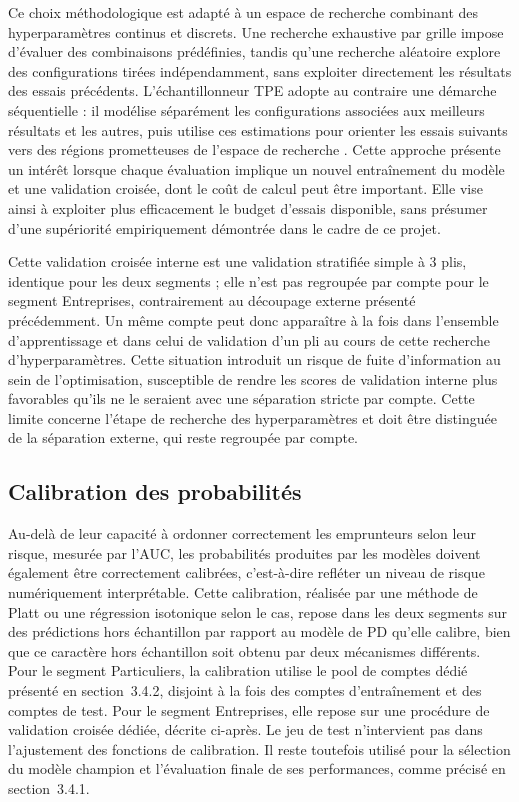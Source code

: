 Ce choix méthodologique est adapté à un espace de recherche combinant des hyperparamètres continus et discrets. Une recherche exhaustive par grille impose d'évaluer des combinaisons prédéfinies, tandis qu'une recherche aléatoire explore des configurations tirées indépendamment, sans exploiter directement les résultats des essais précédents. L'échantillonneur TPE adopte au contraire une démarche séquentielle : il modélise séparément les configurations associées aux meilleurs résultats et les autres, puis utilise ces estimations pour orienter les essais suivants vers des régions prometteuses de l'espace de recherche \parencite{BergstraEtAl2011}. Cette approche présente un intérêt lorsque chaque évaluation implique un nouvel entraînement du modèle et une validation croisée, dont le coût de calcul peut être important. Elle vise ainsi à exploiter plus efficacement le budget d'essais disponible, sans présumer d'une supériorité empiriquement démontrée dans le cadre de ce projet.

Cette validation croisée interne est une validation stratifiée simple à 3 plis, identique pour les deux segments ; elle n'est pas regroupée par compte pour le segment Entreprises, contrairement au découpage externe présenté précédemment. Un même compte peut donc apparaître à la fois dans l'ensemble d'apprentissage et dans celui de validation d'un pli au cours de cette recherche d'hyperparamètres. Cette situation introduit un risque de fuite d'information au sein de l'optimisation, susceptible de rendre les scores de validation interne plus favorables qu'ils ne le seraient avec une séparation stricte par compte. Cette limite concerne l'étape de recherche des hyperparamètres et doit être distinguée de la séparation externe, qui reste regroupée par compte.

\subsection{Calibration des probabilités}

Au-delà de leur capacité à ordonner correctement les emprunteurs selon leur risque, mesurée par l'AUC, les probabilités produites par les modèles doivent également être correctement calibrées, c'est-à-dire refléter un niveau de risque numériquement interprétable. Cette calibration, réalisée par une méthode de Platt ou une régression isotonique selon le cas, repose dans les deux segments sur des prédictions hors échantillon par rapport au modèle de PD qu'elle calibre, bien que ce caractère hors échantillon soit obtenu par deux mécanismes différents. Pour le segment Particuliers, la calibration utilise le pool de comptes dédié présenté en section~3.4.2, disjoint à la fois des comptes d'entraînement et des comptes de test. Pour le segment Entreprises, elle repose sur une procédure de validation croisée dédiée, décrite ci-après. Le jeu de test n'intervient pas dans l'ajustement des fonctions de calibration. Il reste toutefois utilisé pour la sélection du modèle champion et l'évaluation finale de ses performances, comme précisé en section~3.4.1.

